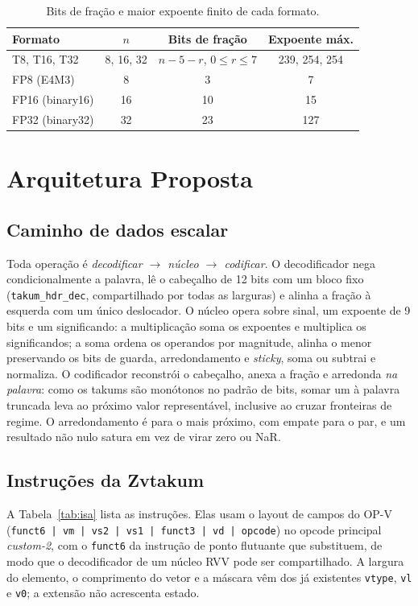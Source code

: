 \documentclass[conference]{IEEEtran}
\newcommand{\code}[1]{\texttt{#1}}
\begin{document}
\begin{table}[t]
\caption{Bits de fração e maior expoente finito de cada formato.}
\label{tab:formats}
\centering
\setlength{\tabcolsep}{4pt}
\begin{tabular}{@{}lccc@{}}
\toprule
Formato & $n$ & Bits de fração & Expoente máx.\\
\midrule
T8, T16, T32 & 8, 16, 32 & $n-5-r$,\; $0\le r\le 7$ & 239, 254, 254\\
FP8 (E4M3) & 8 & 3 & 7\\
FP16 (binary16) & 16 & 10 & 15\\
FP32 (binary32) & 32 & 23 & 127\\
\bottomrule
\end{tabular}
\end{table}

\section{Arquitetura Proposta}

\subsection{Caminho de dados escalar}

Toda operação é \emph{decodificar $\rightarrow$ núcleo $\rightarrow$ codificar}. O decodificador nega
condicionalmente a palavra, lê o cabeçalho de 12 bits com um bloco fixo (\code{takum\_hdr\_dec},
compartilhado por todas as larguras) e alinha a fração à esquerda com um único deslocador. O núcleo opera
sobre sinal, um expoente de 9 bits e um significando: a multiplicação soma os expoentes e multiplica os
significandos; a soma ordena os operandos por magnitude, alinha o menor preservando os bits de guarda,
arredondamento e \emph{sticky}, soma ou subtrai e normaliza. O codificador reconstrói o cabeçalho, anexa a
fração e arredonda \emph{na palavra}: como os takums são monótonos no padrão de bits, somar um à palavra
truncada leva ao próximo valor representável, inclusive ao cruzar fronteiras de regime. O arredondamento é
para o mais próximo, com empate para o par, e um resultado não nulo satura em vez de virar zero ou NaR.

\subsection{Instruções da Zvtakum}

A Tabela~\ref{tab:isa} lista as instruções. Elas usam o layout de campos do OP-V
(\code{funct6 | vm | vs2 | vs1 | funct3 | vd | opcode}) no opcode principal \emph{custom-2}, com o
\code{funct6} da instrução de ponto flutuante que substituem, de modo que o decodificador de um núcleo
RVV pode ser compartilhado. A largura do elemento, o comprimento do vetor e a máscara vêm dos já
existentes \code{vtype}, \code{vl} e \code{v0}; a extensão não acrescenta estado.
\end{document}
